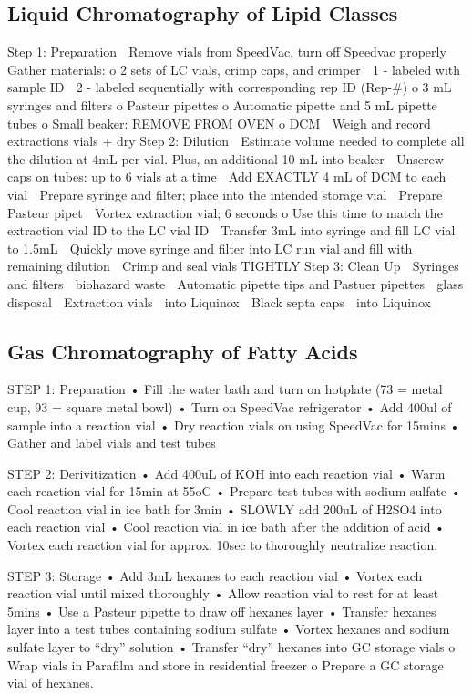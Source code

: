 \documentclass[review]{elsarticle}
\begin{document}
\subsection{Liquid Chromatography of Lipid Classes}
Step 1: Preparation
	Remove vials from SpeedVac, turn off Speedvac properly
	Gather materials:
o	2 sets of LC vials, crimp caps, and crimper
	1 - labeled with sample ID
	2 - labeled sequentially with corresponding rep ID (Rep-#)
o	3 mL syringes and filters
o	Pasteur pipettes
o	Automatic pipette and 5 mL pipette tubes
o	Small beaker: REMOVE FROM OVEN
o	DCM
	Weigh and record extractions vials + dry
Step 2: Dilution
	Estimate volume needed to complete all the dilution at 4mL per vial. Plus, an additional 10 mL into beaker
	Unscrew caps on tubes: up to 6 vials at a time
	Add EXACTLY 4 mL of DCM to each vial
	Prepare syringe and filter; place into the intended storage vial
	Prepare Pasteur pipet
	Vortex extraction vial; 6 seconds 
o	Use this time to match the extraction vial ID to the LC vial ID
	Transfer 3mL into syringe and fill LC vial to 1.5mL
	Quickly move syringe and filter into LC run vial and fill with remaining dilution
	Crimp and seal vials TIGHTLY
Step 3: Clean Up
	Syringes and filters  biohazard waste
	Automatic pipette tips and Pastuer pipettes  glass disposal
	Extraction vials  into Liquinox
	Black septa caps  into Liquinox

\subsection{Gas Chromatography of Fatty Acids}
STEP 1: Preparation
•	Fill the water bath and turn on hotplate (73 = metal cup, 93 = square metal bowl)
•	Turn on SpeedVac refrigerator 
•	Add 400ul of sample into a reaction vial
•	Dry reaction vials on using SpeedVac for 15mins
•	Gather and label vials and test tubes

STEP 2: Derivitization
•	Add 400uL of KOH into each reaction vial
•	Warm each reaction vial for 15min at 55oC
•	Prepare test tubes with sodium sulfate
•	Cool  reaction vial in ice bath for 3min
•	SLOWLY add 200uL of H2SO4 into each reaction vial 
•	Cool reaction vial in ice bath after the addition of acid
•	Vortex each reaction vial for approx. 10sec to thoroughly neutralize reaction.

STEP 3: Storage
•	Add 3mL hexanes to each reaction vial
•	Vortex each reaction vial until mixed thoroughly
•	Allow reaction vial to rest for at least 5mins
•	Use a Pasteur pipette to draw off hexanes layer
•	Transfer hexanes layer into a test tubes containing sodium sulfate
•	Vortex hexanes and sodium sulfate layer to “dry” solution
•	Transfer “dry” hexanes into GC storage vials
o	Wrap vials in Parafilm and store in residential freezer
o	Prepare a GC storage vial of hexanes.
\end{document}
